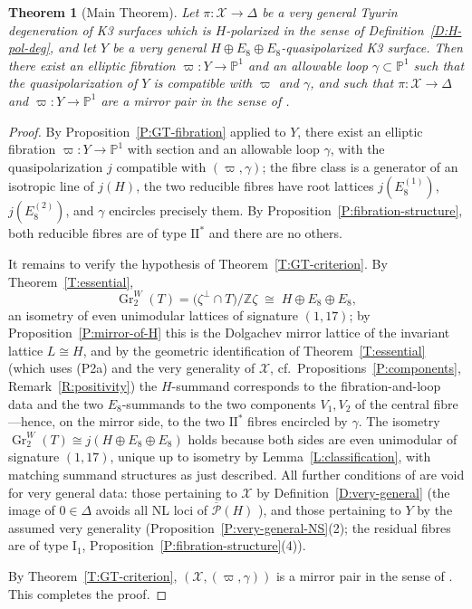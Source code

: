 \documentclass[11pt]{amsart}
\theoremstyle{plain}
\newtheorem{theorem}{Theorem}[section]
\theoremstyle{definition}
\theoremstyle{remark}
\numberwithin{equation}{section}
\begin{document}
\begin{theorem}[Main Theorem]\label{T:main}
Let \(\pi\colon\mathcal X\to\Delta\) be a very general Tyurin degeneration of
K3 surfaces which is \(H\)-polarized in the sense of
Definition~\ref{D:H-pol-deg}, and let \(Y\) be a very general
\(H\oplus E_{8}\oplus E_{8}\)-quasipolarized K3 surface. Then there exist an
elliptic fibration \(\varpi\colon Y\to\mathbb P^{1}\) and an allowable loop
\(\gamma\subset\mathbb P^{1}\) such that the quasipolarization of \(Y\) is
compatible with \(\varpi\) and \(\gamma\), and such that
\(\pi\colon\mathcal X\to\Delta\) and \(\varpi\colon Y\to\mathbb P^{1}\) are a
mirror pair in the sense of \cite[Definition 5.1]{dfk3slpms}.
\end{theorem}

\begin{proof}
By Proposition~\ref{P:GT-fibration} applied to \(Y\), there exist an
elliptic fibration \(\varpi\colon Y\to\mathbb P^{1}\) with section and an
allowable loop \(\gamma\), with the quasipolarization \(j\) compatible with
\((\varpi,\gamma)\); the fibre class is a generator of an isotropic line of
\(j(H)\), the two reducible fibres have root lattices
\(j(E_{8}^{(1)})\), \(j(E_{8}^{(2)})\), and \(\gamma\) encircles precisely
them. By Proposition~\ref{P:fibration-structure}, both reducible fibres are
of type \(\mathrm{II}^{*}\) and there are no others.

It remains to verify the hypothesis of Theorem~\ref{T:GT-criterion}. By
Theorem~\ref{T:essential},
\[
\operatorname{Gr}^{W}_{2}(T)
=\bigl(\zeta^{\perp}\cap T\bigr)/\mathbb Z\zeta\;\cong\;
H\oplus E_{8}\oplus E_{8},
\]
an isometry of even unimodular lattices of signature \((1,17)\); by
Proposition~\ref{P:mirror-of-H} this is the Dolgachev mirror lattice of the
invariant lattice \(L\cong H\), and by the geometric identification of
Theorem~\ref{T:essential} (which uses (P2a) and the very generality of
\(\mathcal X\), cf.\ Propositions~\ref{P:components},
Remark~\ref{R:positivity}) the \(H\)-summand corresponds to the
fibration-and-loop data and the two \(E_{8}\)-summands to the two components
\(V_{1},V_{2}\) of the central fibre---hence, on the mirror side, to the two
\(\mathrm{II}^{*}\) fibres encircled by \(\gamma\). The isometry
\(\operatorname{Gr}^{W}_{2}(T)\cong j(H\oplus E_{8}\oplus E_{8})\) holds
because both sides are even unimodular of signature \((1,17)\), unique up to
isometry by Lemma~\ref{L:classification}, with matching summand structures as
just described. All further conditions of
\cite[Definition 5.1]{dfk3slpms} are void for very general data: those
pertaining to \(\mathcal X\) by Definition~\ref{D:very-general} (the image of
\(0\in\Delta\) avoids all NL loci of \(\overline{\mathcal P}(H)\)
\cite{cmek3sspt}), and those pertaining to \(Y\) by the assumed very
generality (Proposition~\ref{P:very-general-NS}(2); the residual fibres are
of type \(\mathrm I_{1}\), Proposition~\ref{P:fibration-structure}(4)).

By Theorem~\ref{T:GT-criterion}, \((\mathcal X,(\varpi,\gamma))\) is a mirror
pair in the sense of \cite[Definition 5.1]{dfk3slpms}. This completes the
proof.
\end{proof}
\end{document}
